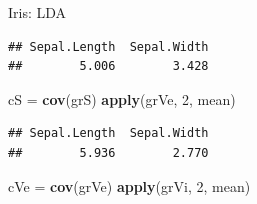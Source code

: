 \documentclass[10pt,ignorenonframetext,]{beamer}
\newenvironment{Shaded}{\begin{snugshade}}{\end{snugshade}}
\newcommand{\KeywordTok}[1]{\textcolor[rgb]{0.13,0.29,0.53}{\textbf{#1}}}
\newcommand{\DecValTok}[1]{\textcolor[rgb]{0.00,0.00,0.81}{#1}}
\newcommand{\StringTok}[1]{\textcolor[rgb]{0.31,0.60,0.02}{#1}}
\newcommand{\CommentTok}[1]{\textcolor[rgb]{0.56,0.35,0.01}{\textit{#1}}}
\newcommand{\OperatorTok}[1]{\textcolor[rgb]{0.81,0.36,0.00}{\textbf{#1}}}
\newcommand{\NormalTok}[1]{#1}
\begin{document}
\begin{frame}[fragile]

\begin{block}{Iris: LDA}

\begin{Shaded}
\end{Shaded}

\begin{verbatim}
## Sepal.Length  Sepal.Width 
##        5.006        3.428
\end{verbatim}

\begin{Shaded}
\begin{Highlighting}[]
\NormalTok{cS =}\StringTok{ }\KeywordTok{cov}\NormalTok{(grS)}
\KeywordTok{apply}\NormalTok{(grVe, }\DecValTok{2}\NormalTok{, mean)}
\end{Highlighting}
\end{Shaded}

\begin{verbatim}
## Sepal.Length  Sepal.Width 
##        5.936        2.770
\end{verbatim}

\begin{Shaded}
\begin{Highlighting}[]
\NormalTok{cVe =}\StringTok{ }\KeywordTok{cov}\NormalTok{(grVe)}
\KeywordTok{apply}\NormalTok{(grVi, }\DecValTok{2}\NormalTok{, mean)}
\end{Highlighting}
\end{Shaded}


\end{block}
\end{frame}
\end{document}
